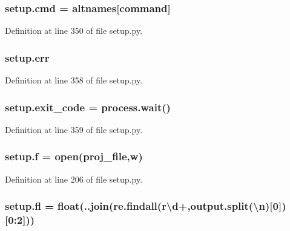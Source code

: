 \subsubsection[{\texorpdfstring{cmd}{cmd}}]{\setlength{\rightskip}{0pt plus 5cm}setup.\+cmd = {\bf altnames}\mbox{[}command\mbox{]}}\hypertarget{namespacesetup_a27ac718b5c714e7f887a5769bb81e54e}{}\label{namespacesetup_a27ac718b5c714e7f887a5769bb81e54e}


Definition at line 350 of file setup.\+py.

\subsubsection[{\texorpdfstring{err}{err}}]{\setlength{\rightskip}{0pt plus 5cm}setup.\+err}\hypertarget{namespacesetup_ad9eccefc3ae62bb9f91bbbfa97900e49}{}\label{namespacesetup_ad9eccefc3ae62bb9f91bbbfa97900e49}


Definition at line 358 of file setup.\+py.

\subsubsection[{\texorpdfstring{exit\+\_\+code}{exit_code}}]{\setlength{\rightskip}{0pt plus 5cm}setup.\+exit\+\_\+code = process.\+wait()}\hypertarget{namespacesetup_a7e4d34412eadfa1481215bd61b81d64d}{}\label{namespacesetup_a7e4d34412eadfa1481215bd61b81d64d}


Definition at line 359 of file setup.\+py.

\subsubsection[{\texorpdfstring{f}{f}}]{\setlength{\rightskip}{0pt plus 5cm}setup.\+f = open({\bf proj\+\_\+file},\textquotesingle{}w\textquotesingle{})}\hypertarget{namespacesetup_aea6945a959274b18887b0be79239ead7}{}\label{namespacesetup_aea6945a959274b18887b0be79239ead7}


Definition at line 206 of file setup.\+py.

\subsubsection[{\texorpdfstring{fl}{fl}}]{\setlength{\rightskip}{0pt plus 5cm}setup.\+fl = float(\textquotesingle{}.\textquotesingle{}.join(re.\+findall(r\textquotesingle{}\textbackslash{}d+\textquotesingle{},output.\+split(\textquotesingle{}\textbackslash{}n\textquotesingle{})\mbox{[}0\mbox{]})\mbox{[}0\+:2\mbox{]}))}\hypertarget{namespacesetup_a8ebf34a9903eb2abbfbd92f17e3b89a4}{}\label{namespacesetup_a8ebf34a9903eb2abbfbd92f17e3b89a4}


